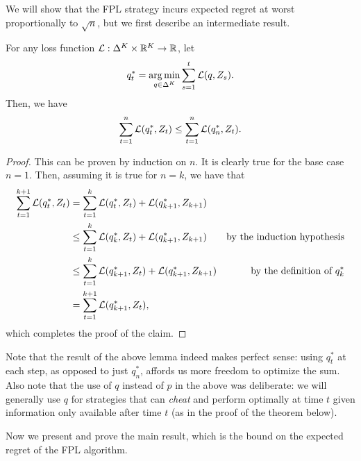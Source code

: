 We will show that the FPL strategy incurs expected regret at worst proportionally to $\sqrt{n}$, but we first describe an intermediate result.
\begin{lemma}\label{lem:be_the_leader}
For any loss function $\mathcal{L} : \Delta^K \times \mathbb{R}^K \rightarrow \mathbb{R}$, let
\[
q_t^* = \operatorname*{arg\,min}_{q \in \Delta^K} \sum_{s=1}^t \mathcal{L}(q, Z_s).
\]
Then, we have
\[
\sum_{t=1}^n \mathcal{L}(q_t^*, Z_t) \leq \sum_{t=1}^n \mathcal{L}(q^*_n, Z_t).
\]
\begin{proof}
This can be proven by induction on $n$. It is clearly true for the base case $n = 1$. Then, assuming it is true for $n = k$, we have that
\begin{align*}
\sum_{t=1}^{k+1} \mathcal{L}(q_t^*, Z_t) &= \sum_{t=1}^k \mathcal{L}(q_t^*, Z_t) + \mathcal{L}(q_{k+1}^*, Z_{k+1}) &\\
&\leq \sum_{t=1}^k \mathcal{L}(q_k^*, Z_t) + \mathcal{L}(q_{k+1}^*, Z_{k+1}) &\text{by the induction hypothesis} \\
&\leq \sum_{t=1}^k \mathcal{L}(q_{k+1}^*, Z_t) + \mathcal{L}(q_{k+1}^*, Z_{k+1}) &\text{by the definition of $q_k^*$} \\
&= \sum_{t=1}^{k+1} \mathcal{L}(q_{k+1}^*, Z_t),
\end{align*}
which completes the proof of the claim.
\end{proof}
\end{lemma}

Note that the result of the above lemma indeed makes perfect sense: using $q_t^*$ at each step, as opposed to just $q_n^*$, affords us more freedom to optimize the sum. Also note that the use of $q$ instead of $p$ in the above was deliberate: we will generally use $q$ for strategies that can \emph{cheat} and perform optimally at time $t$ given information only available after time $t$ (as in the proof of the theorem below).

Now we present and prove the main result, which is the bound on the expected regret of the FPL algorithm.

